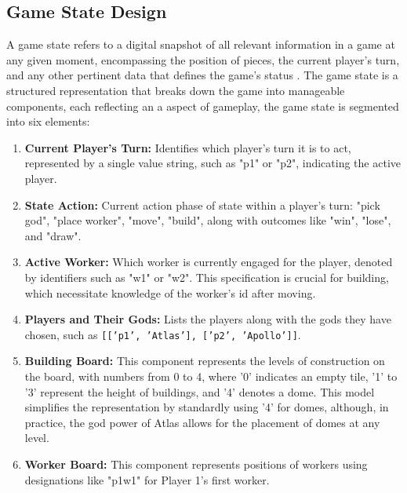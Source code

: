 \documentclass{telkomnika}
\begin{document}
\subsection{Game State Design}
A game state refers to a digital snapshot of all relevant information in a game at any given moment, encompassing the position of pieces, the current player's turn, and any other pertinent data that defines the game's status \cite{Jarvinen2008}. The game state is a structured representation that breaks down the game into manageable components, each reflecting an a aspect of gameplay, the game state is segmented into six elements:
\begin{enumerate}
    \item \textbf{Current Player's Turn:} Identifies which player's turn it is to act, represented by a single value string, such as "p1" or "p2", indicating the active player.
    \item \textbf{State Action:} Current action phase of state within a player's turn: "pick god", "place worker", "move", "build", along with outcomes like "win", "lose", and "draw".
    \item \textbf{Active Worker:} Which worker is currently engaged for the player, denoted by identifiers such as "w1" or "w2". This specification is crucial for building, which necessitate knowledge of the worker's id after moving.
    \item \textbf{Players and Their Gods:} Lists the players along with the gods they have chosen, such as \texttt{[['p1', 'Atlas'], ['p2', 'Apollo']]}.
    \item \textbf{Building Board:} This component represents the levels of construction on the board, with numbers from 0 to 4, where '0' indicates an empty tile, '1' to '3' represent the height of buildings, and '4' denotes a dome. This model simplifies the representation by standardly using '4' for domes, although, in practice, the god power of Atlas allows for the placement of domes at any level.
    \item \textbf{Worker Board:} This component represents positions of workers using designations like "p1w1" for Player 1's first worker.
\end{enumerate}
\end{document}
